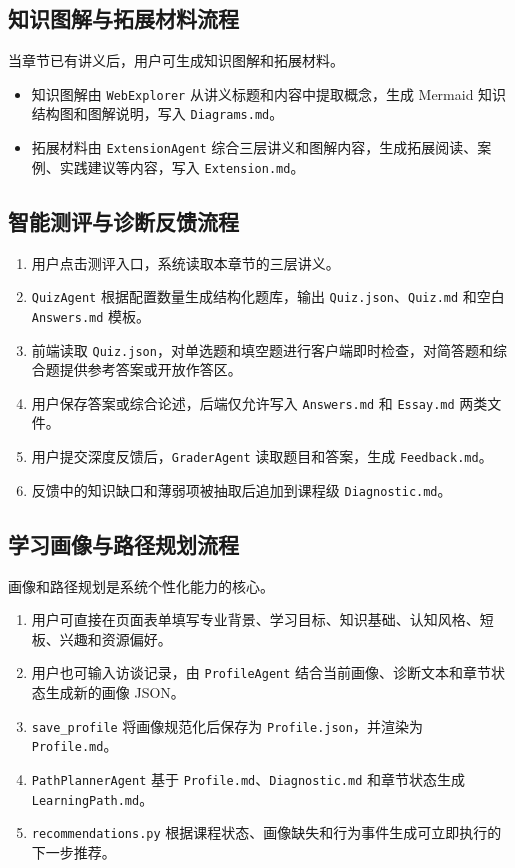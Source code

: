 \documentclass[UTF8,fontset=windows,zihao=-4,openany]{ctexrep}
\begin{document}
\subsection{知识图解与拓展材料流程}

当章节已有讲义后，用户可生成知识图解和拓展材料。
\begin{itemize}
  \item 知识图解由 \texttt{WebExplorer} 从讲义标题和内容中提取概念，生成 Mermaid 知识结构图和图解说明，写入 \texttt{Diagrams.md}。
  \item 拓展材料由 \texttt{ExtensionAgent} 综合三层讲义和图解内容，生成拓展阅读、案例、实践建议等内容，写入 \texttt{Extension.md}。
\end{itemize}

\subsection{智能测评与诊断反馈流程}

\begin{enumerate}
  \item 用户点击测评入口，系统读取本章节的三层讲义。
  \item \texttt{QuizAgent} 根据配置数量生成结构化题库，输出 \texttt{Quiz.json}、\texttt{Quiz.md} 和空白 \texttt{Answers.md} 模板。
  \item 前端读取 \texttt{Quiz.json}，对单选题和填空题进行客户端即时检查，对简答题和综合题提供参考答案或开放作答区。
  \item 用户保存答案或综合论述，后端仅允许写入 \texttt{Answers.md} 和 \texttt{Essay.md} 两类文件。
  \item 用户提交深度反馈后，\texttt{GraderAgent} 读取题目和答案，生成 \texttt{Feedback.md}。
  \item 反馈中的知识缺口和薄弱项被抽取后追加到课程级 \texttt{Diagnostic.md}。
\end{enumerate}

\subsection{学习画像与路径规划流程}

画像和路径规划是系统个性化能力的核心。
\begin{enumerate}
  \item 用户可直接在页面表单填写专业背景、学习目标、知识基础、认知风格、短板、兴趣和资源偏好。
  \item 用户也可输入访谈记录，由 \texttt{ProfileAgent} 结合当前画像、诊断文本和章节状态生成新的画像 JSON。
  \item \texttt{save\_profile} 将画像规范化后保存为 \texttt{Profile.json}，并渲染为 \texttt{Profile.md}。
  \item \texttt{PathPlannerAgent} 基于 \texttt{Profile.md}、\texttt{Diagnostic.md} 和章节状态生成 \texttt{LearningPath.md}。
  \item \texttt{recommendations.py} 根据课程状态、画像缺失和行为事件生成可立即执行的下一步推荐。
\end{enumerate}
\end{document}
